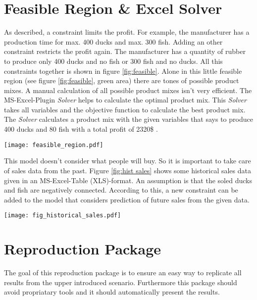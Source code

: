 \documentclass{article}
\begin{document}
\begin{multicols}{2}
\section{Feasible Region \& Excel Solver}\label{cap:feasible}
As described, a constraint limits the profit. For example, the manufacturer has a production time for max. 400 ducks and max. 300 fish. Adding an other constraint restricts the profit again. The manufacturer has a quantity of rubber to produce only 400 ducks and no fish or 300 fish and no ducks. All this constraints together is shown in figure \ref{fig:feasible}. Alone in this little feasible region (see figure \ref{fig:feasible}, green area) there are tones of possible product mixes. A manual calculation of all possible product mixes isn't very efficient. The MS-Excel-Plugin \textit{Solver} \cite{microsoft} helps to calculate the optimal product mix. This \textit{Solver} takes all variables and the objective function to calculate the best product mix. The \textit{Solver} calculates a product mix with the given variables that says to produce 400 ducks and 80 fish with a total profit of 2320\$ \cite[p. 96]{micheal}.

\begin{center}
\texttt{[image: feasible\_region.pdf]}
\label{fig:feasible}
\end{center}

This model doesn't consider what people will buy. So it is important to take care of sales data from the past. Figure \ref{fig:hist sales} shows some historical sales data given in an MS-Excel-Table (XLS)-format. An assumption is that the soled ducks and fish are negatively connected. According to this, a new constraint can be added to the model that considers prediction of future sales from the given data.

\begin{center}
\texttt{[image: fig\_historical\_sales.pdf]}
\label{fig:hist sales}
\end{center}

\section{Reproduction Package}
The goal of this reproduction package is to ensure an easy way to replicate all results from the upper introduced scenario. Furthermore this package should avoid propriatary tools and it should automatically present the results.



\end{multicols}
\end{document}
